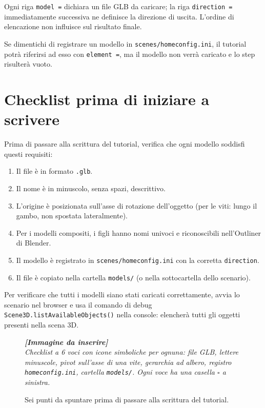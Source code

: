﻿\documentclass[a4paper,12pt,oneside]{book}
\newcommand{\kw}[1]{\texttt{\color{keycolor}#1}}
\newcommand{\file}[1]{\texttt{#1}}
\newcommand{\imgph}[2]{%
  \begin{tcolorbox}[colback=cvtlightblue!30,colframe=cvtblue!40,%
    width=#1,halign=center,valign=center,height=5cm,boxrule=0.5pt,arc=3pt]%
    \textcolor{cvtgray}{\itshape\footnotesize\textbf{[Immagine da inserire]}\\[3pt]#2}%
  \end{tcolorbox}}
\begin{document}
Ogni riga \texttt{model =} dichiara un file GLB da caricare; la riga
\texttt{direction =} immediatamente successiva ne definisce la direzione
di uscita. L'ordine di elencazione non influisce sul risultato finale.

\begin{attenzione}
Se dimentichi di registrare un modello in \file{scenes/homeconfig.ini},
il tutorial potrà riferirsi ad esso con \kw{element =}, ma il modello
non verrà caricato e lo step risulterà vuoto.
\end{attenzione}

\section{Checklist prima di iniziare a scrivere}

Prima di passare alla scrittura del tutorial, verifica che ogni modello
soddisfi questi requisiti:

\begin{enumerate}
  \item[$\square$] Il file è in formato \file{.glb}.
  \item[$\square$] Il nome è in minuscolo, senza spazi, descrittivo.
  \item[$\square$] L'origine è posizionata sull'asse di rotazione
        dell'oggetto (per le viti: lungo il gambo, non spostata
        lateralmente).
  \item[$\square$] Per i modelli compositi, i figli hanno nomi univoci e
        riconoscibili nell'Outliner di Blender.
  \item[$\square$] Il modello è registrato in \file{scenes/homeconfig.ini}
        con la corretta \texttt{direction}.
  \item[$\square$] Il file è copiato nella cartella \file{models/}
        (o nella sottocartella dello scenario).
\end{enumerate}

\begin{trucchetto}
Per verificare che tutti i modelli siano stati caricati correttamente,
avvia lo scenario nel browser e usa il comando di debug
\texttt{Scene3D.listAvailableObjects()} nella console: elencherà tutti
gli oggetti presenti nella scena 3D.
\end{trucchetto}

\begin{figure}[H]
  \centering
  \imgph{12cm}{Checklist a 6 voci con icone simboliche per ognuna: file GLB, lettere minuscole, pivot sull'asse di una vite, gerarchia ad albero, registro \file{homeconfig.ini}, cartella \file{models/}. Ogni voce ha una casella $\square$ a sinistra.}
  \caption{Sei punti da spuntare prima di passare alla scrittura del tutorial.}
  \label{fig:checklist-modelli}
\end{figure}
\end{document}
